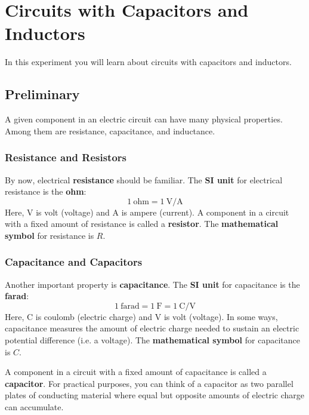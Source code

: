 \setcounter{chapter}{4}
\chapter{Circuits with Capacitors and Inductors}
%
In this experiment you will learn about circuits with capacitors and inductors.
%
\section{Preliminary}
%
A given component in an electric circuit can have many physical properties. Among them are resistance, capacitance, and inductance.
%
\subsection{Resistance and Resistors}
%
By now, electrical \textbf{resistance} should be familiar. The \textbf{SI unit} for electrical resistance is the \textbf{ohm}:
\begin{equation}
	1 \ \text{ohm} = 1 \ \text{V/A}
\end{equation}
Here, V is volt (voltage) and A is ampere (current). A component in a circuit with a fixed amount of resistance is called a \textbf{resistor}. The \textbf{mathematical symbol} for resistance is $R$.
%
\subsection{Capacitance and Capacitors}
%
Another important property is \textbf{capacitance}. The \textbf{SI unit} for capacitance is the \textbf{farad}:
\begin{equation}
	1 \ \text{farad} = 1 \ \text{F} = 1 \ \text{C/V}
\end{equation}
Here, C is coulomb (electric charge) and V is volt (voltage). In some ways, capacitance measures the amount of electric charge needed to sustain an electric potential difference (i.e. a voltage). The \textbf{mathematical symbol} for capacitance is $C$.

A component in a circuit with a fixed amount of capacitance is called a \textbf{capacitor}. For practical purposes, you can think of a capacitor as two parallel plates of conducting material where equal but opposite amounts of electric charge can accumulate.
%
